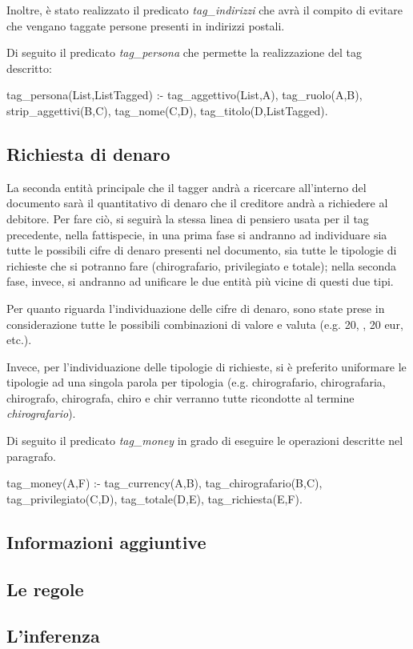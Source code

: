 Inoltre, è stato realizzato il predicato \emph{tag\_indirizzi} che avrà il compito di evitare che vengano taggate persone presenti in indirizzi postali.

Di seguito il predicato \emph{tag\_persona} che permette la realizzazione del tag descritto:

\begin{prologcode}
tag_persona(List,ListTagged) :-
    tag_aggettivo(List,A),
    tag_ruolo(A,B),
    strip_aggettivi(B,C),
    tag_nome(C,D),
    tag_titolo(D,ListTagged).
\end{prologcode}

\subsection{Richiesta di denaro}
La seconda entità principale che il tagger andrà a ricercare all'interno del documento sarà il quantitativo di denaro che il creditore andrà a richiedere al debitore. Per fare ciò, si seguirà la stessa linea di pensiero usata per il tag precedente, nella fattispecie, in una prima fase si andranno ad individuare sia tutte le possibili cifre di denaro presenti nel documento, sia tutte le tipologie di richieste che si potranno fare (chirografario, privilegiato e totale); nella seconda fase, invece, si andranno ad unificare le due entità più vicine di questi due tipi.

Per quanto riguarda l'individuazione delle cifre di denaro, sono state prese in considerazione tutte le possibili combinazioni di valore e valuta (e.g. 20\texteuro, , 20 eur, etc.).

Invece, per l'individuazione delle tipologie di richieste, si è preferito uniformare le tipologie ad una singola parola per tipologia (e.g. chirografario, chirografaria, chirografo, chirografa, chiro e chir verranno tutte ricondotte al termine \emph{chirografario}).

Di seguito il predicato \emph{tag\_money} in grado di eseguire le operazioni descritte nel paragrafo.

\begin{prologcode}
tag_money(A,F) :- 
    tag_currency(A,B),
    tag_chirografario(B,C),
    tag_privilegiato(C,D),
    tag_totale(D,E),
    tag_richiesta(E,F).
\end{prologcode}

\subsection{Informazioni aggiuntive}



\subsection{Le regole}
\subsection{L'inferenza}